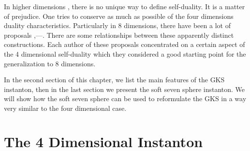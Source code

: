\documentclass[a4paper,12pt]{book}
\begin{document}
In higher dimensions \coordHE{}, there is no unique way to define self-duality.
It is a matter of prejudice. One tries to conserve as much as possible of
the four dimensions duality characteristics. Particularly in 8 dimensions,
there have been a lot of proposals \cite{gks},\cite{wrd}---\cite{landi}.
There are some relationships between these apparently distinct
constructions. Each author of these proposals concentrated on a certain
aspect of the 4 dimensional self-duality which they considered a good
starting point for the generalization to 8 dimensions.

In the second section of this chapter, we list the main features of the GKS
instanton, then in the last section we present the soft seven sphere
instanton. We will show how the soft seven sphere can be used to reformulate
the GKS in a way very similar to the four dimensional case.

\section{The 4 Dimensional Instanton}
\end{document}
